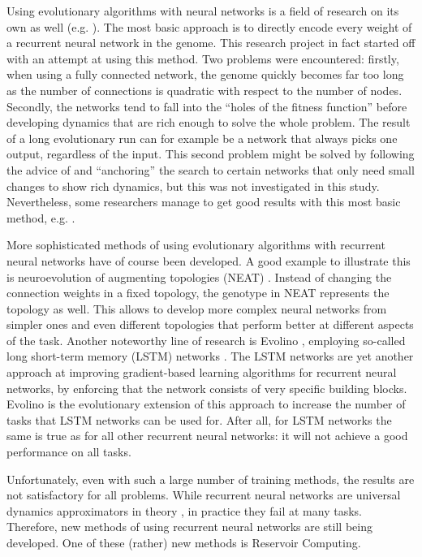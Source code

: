 \documentclass[10pt,a4paper]{report}
\begin{document}
Using evolutionary algorithms with neural networks is a field of research on its own as well (e.g. \citet{Yao1993, Kaiser2010}). The most basic approach is to directly encode every weight of a recurrent neural network in the genome. This research project in fact started off with an attempt at using this method. Two problems were encountered: firstly, when using a fully connected network, the genome quickly becomes far too long as the number of connections is quadratic with respect to the number of nodes. Secondly, the networks tend to fall into the ``holes of the fitness function'' before developing dynamics that are rich enough to solve the whole problem. The result of a long evolutionary run can for example be a network that always picks one output, regardless of the input. This second problem might be solved by following the advice of \citet{Beer1995} and ``anchoring'' the search to certain networks that only need small changes to show rich dynamics, but this was not investigated in this study. Nevertheless, some researchers manage to get good results with this most basic method, e.g. \citet{Paine2005}. 

More sophisticated methods of using evolutionary algorithms with recurrent neural networks have of course been developed. A good example to illustrate this is neuroevolution of augmenting topologies (NEAT) \citep{Stanley2002}. Instead of changing the connection weights in a fixed topology, the genotype in NEAT represents the topology as well. This allows to develop more complex neural networks from simpler ones and even different topologies that perform better at different aspects of the task. Another noteworthy line of research is Evolino \citep{Schmidhuber2007}, employing so-called long short-term memory (LSTM) networks \citep{Hochreiter1997, Gers2001}. The LSTM networks are yet another approach at improving gradient-based learning algorithms for recurrent neural networks, by enforcing that the network consists of very specific building blocks. Evolino is the evolutionary extension of this approach to increase the number of tasks that LSTM networks can be used for. After all, for LSTM networks the same is true as for all other recurrent neural networks: it will not achieve a good performance on all tasks.

Unfortunately, even with such a large number of training methods, the results are not satisfactory for all problems. While recurrent neural networks are universal dynamics approximators in theory \citep{Beer1995}, in practice they fail at many tasks. Therefore, new methods of using recurrent neural networks are still being developed. One of these (rather) new methods is Reservoir Computing.
\end{document}
